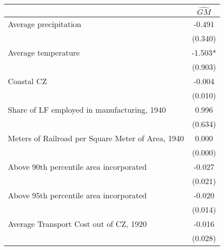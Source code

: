  \begin{tabular}{l*{1}{c}} \toprule
                &\multicolumn{1}{c}{$\widehat{GM}$}\\
\midrule
Average precipitation&   -0.491   \\
                &  (0.340)   \\
\addlinespace
Average temperature&   -1.503*  \\
                &  (0.903)   \\
\addlinespace
Coastal CZ      &   -0.004   \\
                &  (0.010)   \\
\addlinespace
Share of LF employed in manufacturing, 1940&    0.996   \\
                &  (0.634)   \\
\addlinespace
Meters of Railroad per Square Meter of Area, 1940&    0.000   \\
                &  (0.000)   \\
\addlinespace
Above 90th percentile area incorporated&   -0.027   \\
                &  (0.021)   \\
\addlinespace
Above 95th percentile area incorporated&   -0.020   \\
                &  (0.014)   \\
\addlinespace
Average Transport Cost out of CZ, 1920&   -0.016   \\
                &  (0.028)   \\
 \bottomrule \end{tabular}
